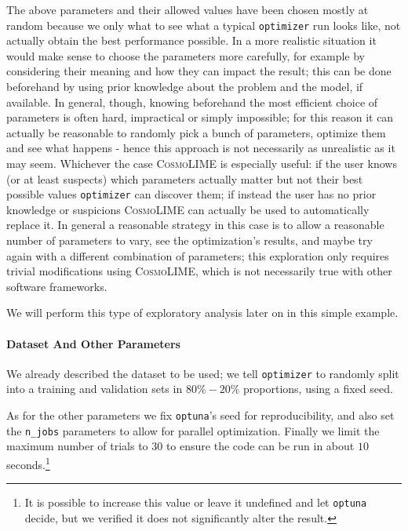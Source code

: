 The above parameters and their allowed values have been chosen mostly at random because we only what to see what a typical \texttt{optimizer} run looks like, not actually obtain the best performance possible.
In a more realistic situation it would make sense to choose the parameters more carefully, for example by considering their meaning and how they can impact the result; this can be done beforehand by using prior knowledge about the problem and the model, if available. In general, though, knowing beforehand the most efficient choice of parameters is often hard, impractical or simply impossible; for this reason it can actually be reasonable to randomly pick a bunch of parameters, optimize them and see what happens - hence this approach is not necessarily as unrealistic as it may seem. 
Whichever the case \textsc{CosmoLIME} is especially useful: if the user knows (or at least suspects) which parameters actually matter but not their best possible values \texttt{optimizer} can discover them; if instead the user has no prior knowledge or suspicions \textsc{CosmoLIME} can actually be used to 
automatically replace it. In general a reasonable strategy in this case is to allow a reasonable number of parameters to vary, see the optimization's results, and maybe try again with a different combination of parameters; this exploration only requires trivial modifications using \textsc{CosmoLIME}, which is not necessarily true with other software frameworks.

We will perform this type of exploratory analysis later on in this simple example.

\paragraph{Dataset And Other Parameters}
We already described the dataset to be used; we tell \texttt{optimizer} to randomly split into a training and validation sets in $80\%-20\%$ proportions, using a fixed seed.

As for the other parameters we fix \texttt{optuna}'s seed for reproducibility, and also set the \texttt{n\_jobs} parameters to allow for parallel optimization. Finally we limit the maximum number of trials to $30$ to ensure the code can be run in about $10$ seconds.\footnote{It is possible to increase this value or leave it undefined and let \texttt{optuna} decide, but we verified it does not significantly alter the result.}

